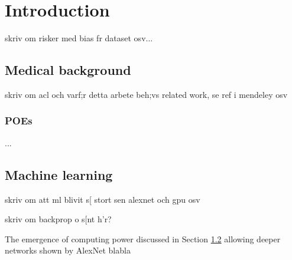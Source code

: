 \chapter{Introduction}



skriv om risker med bias fr dataset osv...

\section{Medical background}
skriv om acl och varf;r detta arbete beh;vs
related work, se ref i mendeley osv
\subsection{POEs}
...

\section{Machine learning} \label{sec:ML}
skriv om att ml blivit s[ stort sen alexnet och gpu osv

skriv om backprop o s[nt h'r?

The emergence of computing power discussed in Section \ref{sec:ML} allowing deeper networks shown by AlexNet \cite{Krizhevsky2012} blabla
